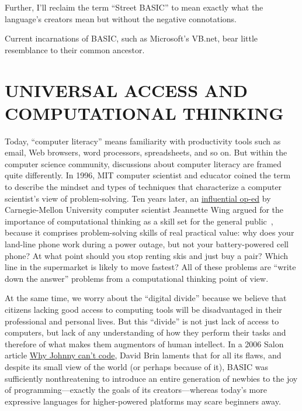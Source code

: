 \documentclass{article}
\begin{document}
Further, I'll reclaim the term ``Street
BASIC'' to mean exactly what the language's creators mean but without
the negative connotations.

Current incarnations of BASIC, such as Microsoft's VB.net, bear little resemblance to
their common ancestor.


\section{UNIVERSAL ACCESS AND COMPUTATIONAL THINKING}



Today, ``computer
literacy'' means familiarity with 
productivity tools such as email, Web browsers, word processors,
spreadsheets, and so on.  
But within the computer science community, discussions about computer
literacy are framed quite differently.  
In 1996, MIT computer scientist and educator
 coined the term  to
describe the mindset and types of techniques that
characterize a computer scientist's view of problem-solving.
Ten years later, an
\href{http://www.cs.cmu.edu/afs/cs/usr/wing/www/publications/Wing06.pdf}{influential op-ed} by Carnegie-Mellon University computer scientist
Jeannette Wing argued for the importance of computational thinking as a
skill set for the general 
public~\cite{wing_computational_thinking}, because it comprises
problem-solving skills of real practical value: why does your land-line
phone work during a power outage, but not your battery-powered cell phone?  At
what point should you stop renting skis and just buy a pair?  Which line
in the supermarket is likely to move fastest?  All of these problems are
``write down the answer'' problems from a computational thinking point
of view.

At the same time, we worry about the ``digital divide''
because we believe that citizens lacking good access to
computing tools will be disadvantaged in their professional and personal
lives.  But this ``divide'' is not just lack of access to computers, but lack
of any understanding of how they perform their tasks and therefore of
what makes them augmentors of human intellect.
In a 2006 Salon article \href{www.salon.com/2006/09/14/basic_2}{Why Johnny
  can't code},
David Brin laments that for
all its flaws, and despite its small view of the world (or perhaps
because of it), BASIC was sufficiently
nonthreatening to introduce an entire generation of newbies
to the joy of programming---exactly
the goals of its creators---whereas today's more expressive languages
for higher-powered platforms may scare beginners away.
\end{document}
